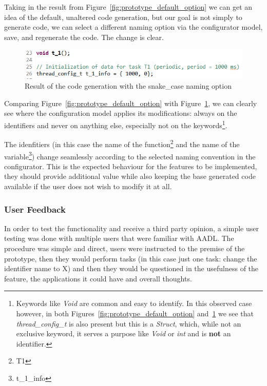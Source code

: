 Taking in the result from Figure~\ref{fig:prototype_default_option} we can get an idea of the default, unaltered code generation, but our goal is not simply to generate code, we can select a different naming option via the configurator model, save, and regenerate the code. The change is clear.

\begin{figure}[htbp]
	\centering
	\includegraphics[height=0.12\textwidth]{snake_case_naming_option.png}
	\caption{Result of the code generation with the snake\_case naming option}
	\label{fig:prototype_snake_case}
\end{figure}

Comparing Figure~\ref{fig:prototype_default_option} with Figure~\ref{fig:prototype_snake_case}, we can clearly see where the configuration model applies its modifications: always on the identifiers and never on anything else, especially not on the keywords\footnote{Keywords like \textit{Void} are common and easy to identify. In this observed case however, in both Figures~\ref{fig:prototype_default_option} and~\ref{fig:prototype_snake_case} we see that \textit{thread\_config\_t} is also present but this is a \textit{Struct}, which, while not an exclusive keyword, it serves a purpose like \textit{Void} or \textit{int} and is \textbf{not} an identifier.}.

The idenfitiers (in this case the name of the function\footnote{T1} and the name of the variable\footnote{t\_1\_info}) change seamlessly according to the selected naming convention in the configurator. This is the expected behaviour for the features to be implemented, they should provide additional value while also keeping the base generated code available if the user does not wish to modify it at all. 

\subsubsection{User Feedback}

In order to test the functionality and receive a third party opinion, a simple user testing was done with multiple users that were familiar with AADL. The procedure was simple and direct, users were instructed to the premise of the prototype, then they would perform tasks (in this case just one task: change the identifier name to X) and then they would be questioned in the usefulness of the feature, the applications it could have and overall thoughts.

